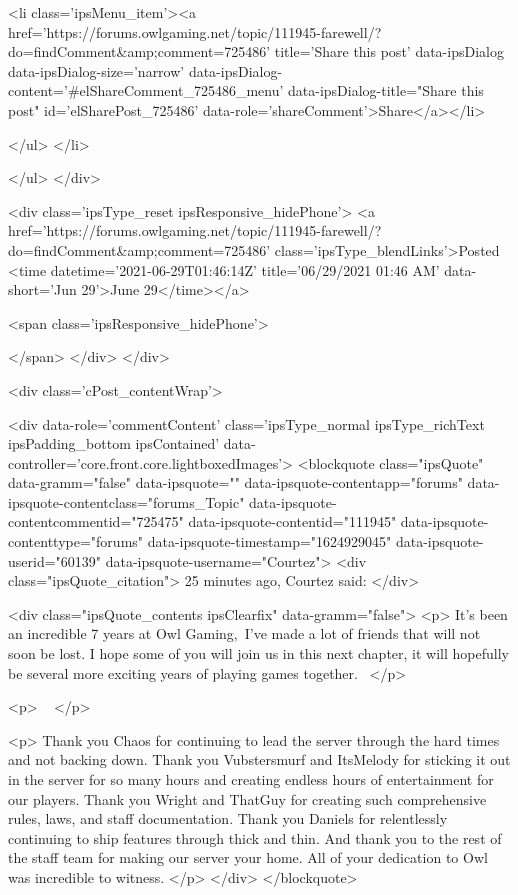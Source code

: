 						
							<li class='ipsMenu_item'><a href='https://forums.owlgaming.net/topic/111945-farewell/?do=findComment&amp;comment=725486' title='Share this post' data-ipsDialog data-ipsDialog-size='narrow' data-ipsDialog-content='#elShareComment_725486_menu' data-ipsDialog-title="Share this post" id='elSharePost_725486' data-role='shareComment'>Share</a></li>
						
                        
						
						
						
							
								
							
							
							
							
							
							
						
					</ul>
				</li>
				
			</ul>
		</div>

		<div class='ipsType_reset ipsResponsive_hidePhone'>
			<a href='https://forums.owlgaming.net/topic/111945-farewell/?do=findComment&amp;comment=725486' class='ipsType_blendLinks'>Posted <time datetime='2021-06-29T01:46:14Z' title='06/29/2021 01:46  AM' data-short='Jun 29'>June 29</time></a> 
			
			<span class='ipsResponsive_hidePhone'>
				
				
			</span>
		</div>
	</div>

	

    

	<div class='cPost_contentWrap'>
		
		<div data-role='commentContent' class='ipsType_normal ipsType_richText ipsPadding_bottom ipsContained' data-controller='core.front.core.lightboxedImages'>
			<blockquote class="ipsQuote" data-gramm="false" data-ipsquote="" data-ipsquote-contentapp="forums" data-ipsquote-contentclass="forums_Topic" data-ipsquote-contentcommentid="725475" data-ipsquote-contentid="111945" data-ipsquote-contenttype="forums" data-ipsquote-timestamp="1624929045" data-ipsquote-userid="60139" data-ipsquote-username="Courtez">
	<div class="ipsQuote_citation">
		25 minutes ago, Courtez said:
	</div>

	<div class="ipsQuote_contents ipsClearfix" data-gramm="false">
		<p>
			It's been an incredible 7 years at Owl Gaming, I've made a lot of friends that will not soon be lost. I hope some of you will join us in this next chapter, it will hopefully be several more exciting years of playing games together. 
		</p>

		<p>
			 
		</p>

		<p>
			Thank you Chaos for continuing to lead the server through the hard times and not backing down. Thank you Vubstersmurf and ItsMelody for sticking it out in the server for so many hours and creating endless hours of entertainment for our players. Thank you Wright and ThatGuy for creating such comprehensive rules, laws, and staff documentation. Thank you Daniels for relentlessly continuing to ship features through thick and thin. And thank you to the rest of the staff team for making our server your home. All of your dedication to Owl was incredible to witness.
		</p>
	</div>
</blockquote>

